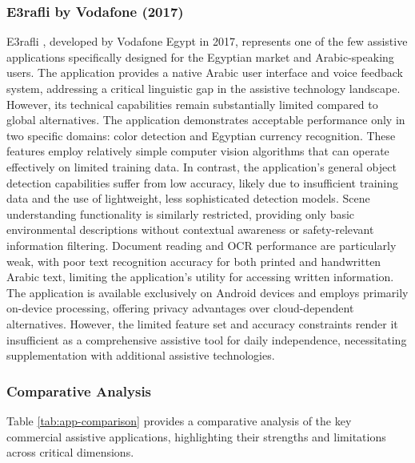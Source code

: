 \documentclass[a4paper]{report}
\begin{document}
\subsubsection{E3rafli by Vodafone (2017)}

E3rafli \cite{vodafone_e3rafli}, developed by Vodafone Egypt in 2017, represents one of the few assistive applications specifically designed for the Egyptian market and Arabic-speaking users. The application provides a native Arabic user interface and voice feedback system, addressing a critical linguistic gap in the assistive technology landscape. However, its technical capabilities remain substantially limited compared to global alternatives. The application demonstrates acceptable performance only in two specific domains: color detection and Egyptian currency recognition. These features employ relatively simple computer vision algorithms that can operate effectively on limited training data. In contrast, the application's general object detection capabilities suffer from low accuracy, likely due to insufficient training data and the use of lightweight, less sophisticated detection models. Scene understanding functionality is similarly restricted, providing only basic environmental descriptions without contextual awareness or safety-relevant information filtering. Document reading and OCR performance are particularly weak, with poor text recognition accuracy for both printed and handwritten Arabic text, limiting the application's utility for accessing written information. The application is available exclusively on Android devices and employs primarily on-device processing, offering privacy advantages over cloud-dependent alternatives. However, the limited feature set and accuracy constraints render it insufficient as a comprehensive assistive tool for daily independence, necessitating supplementation with additional assistive technologies.

\subsubsection{Comparative Analysis}

Table \ref{tab:app-comparison} provides a comparative analysis of the key commercial assistive applications, highlighting their strengths and limitations across critical dimensions.
\end{document}
